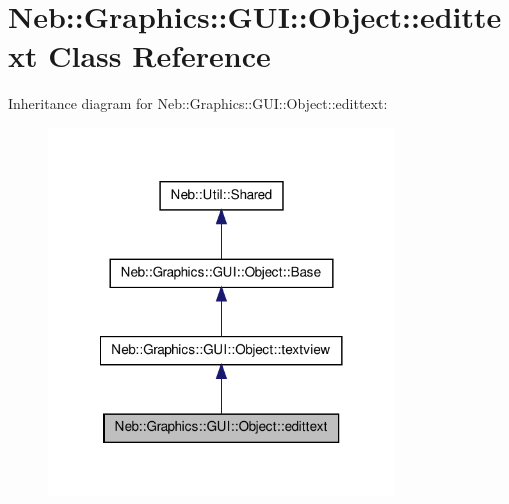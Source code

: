 \hypertarget{classNeb_1_1Graphics_1_1GUI_1_1Object_1_1edittext}{\section{\-Neb\-:\-:\-Graphics\-:\-:\-G\-U\-I\-:\-:\-Object\-:\-:edittext \-Class \-Reference}
\label{classNeb_1_1Graphics_1_1GUI_1_1Object_1_1edittext}
}


\-Inheritance diagram for \-Neb\-:\-:\-Graphics\-:\-:\-G\-U\-I\-:\-:\-Object\-:\-:edittext\-:\nopagebreak
\begin{figure}[H]
\begin{center}
\leavevmode
\includegraphics[width=260pt]{classNeb_1_1Graphics_1_1GUI_1_1Object_1_1edittext__inherit__graph}
\end{center}
\end{figure}


